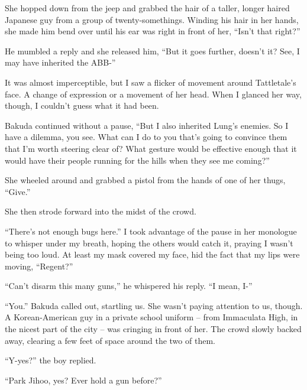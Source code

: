 She hopped down from the jeep and grabbed the hair of a taller, longer haired Japanese guy from a group of twenty-somethings.  Winding his hair in her hands, she made him bend over until his ear was right in front of her, ``Isn't that right?''



He mumbled a reply and she released him, ``But it goes further, doesn't it?  See, I may have inherited the ABB-''



It was almost imperceptible, but I saw a flicker of movement around Tattletale's face.  A change of expression or a movement of her head.  When I glanced her way, though, I couldn't guess what it had been.



Bakuda continued without a pause, ``But I also inherited Lung's enemies.  So I have a dilemma, you see.  What can I do to you that's going to convince them that I'm worth steering clear of?  What gesture would be effective enough that it would have their people running for the hills when they see me coming?''



She wheeled around and grabbed a pistol from the hands of one of her thugs, ``Give.''



She then strode forward into the midst of the crowd.



``There's not enough bugs here.'' I took advantage of the pause in her monologue to whisper under my breath, hoping the others would catch it, praying I wasn't being too loud.  At least my mask covered my face, hid the fact that my lips were moving, ``Regent?''



``Can't disarm this many guns,'' he whispered his reply. ``I mean, I-''



``You.'' Bakuda called out, startling us.  She wasn't paying attention to us, though.  A Korean-American guy in a private school uniform – from Immaculata High, in the nicest part of the city – was cringing in front of her.  The crowd slowly backed away, clearing a few feet of space around the two of them.



``Y-yes?'' the boy replied.



``Park Jihoo, yes?  Ever hold a gun before?''



